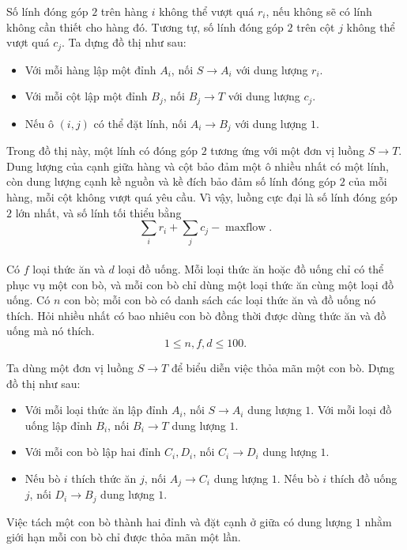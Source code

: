 \documentclass[11pt]{article}
\begin{document}
Số lính đóng góp \(2\) trên hàng \(i\) không thể vượt quá \(r_i\), nếu không
sẽ có lính không cần thiết cho hàng đó. Tương tự, số lính đóng góp \(2\) trên
cột \(j\) không thể vượt quá \(c_j\). Ta dựng đồ thị như sau:
\begin{itemize}
  \item Với mỗi hàng lập một đỉnh \(A_i\), nối \(S\to A_i\) với dung lượng
  \(r_i\).
  \item Với mỗi cột lập một đỉnh \(B_j\), nối \(B_j\to T\) với dung lượng
  \(c_j\).
  \item Nếu ô \((i,j)\) có thể đặt lính, nối \(A_i\to B_j\) với dung lượng
  \(1\).
\end{itemize}

Trong đồ thị này, một lính có đóng góp \(2\) tương ứng với một đơn vị luồng
\(S\to T\). Dung lượng của cạnh giữa hàng và cột bảo đảm một ô nhiều nhất có
một lính, còn dung lượng cạnh kề nguồn và kề đích bảo đảm số lính đóng góp
\(2\) của mỗi hàng, mỗi cột không vượt quá yêu cầu. Vì vậy, luồng cực đại là
số lính đóng góp \(2\) lớn nhất, và số lính tối thiểu bằng
\[
  \sum_i r_i+\sum_j c_j-\operatorname{maxflow}.
\]

\paragraph{}
Có \(f\) loại thức ăn và \(d\) loại đồ uống. Mỗi loại thức ăn hoặc đồ uống chỉ
có thể phục vụ một con bò, và mỗi con bò chỉ dùng một loại thức ăn cùng một
loại đồ uống. Có \(n\) con bò; mỗi con bò có danh sách các loại thức ăn và đồ
uống nó thích. Hỏi nhiều nhất có bao nhiêu con bò đồng thời được dùng thức ăn
và đồ uống mà nó thích.
\[
  1\le n,f,d\le 100.
\]

Ta dùng một đơn vị luồng \(S\to T\) để biểu diễn việc thỏa mãn một con bò.
Dựng đồ thị như sau:
\begin{itemize}
  \item Với mỗi loại thức ăn lập đỉnh \(A_i\), nối \(S\to A_i\) dung lượng
  \(1\). Với mỗi loại đồ uống lập đỉnh \(B_i\), nối \(B_i\to T\) dung lượng
  \(1\).
  \item Với mỗi con bò lập hai đỉnh \(C_i,D_i\), nối \(C_i\to D_i\) dung
  lượng \(1\).
  \item Nếu bò \(i\) thích thức ăn \(j\), nối \(A_j\to C_i\) dung lượng
  \(1\). Nếu bò \(i\) thích đồ uống \(j\), nối \(D_i\to B_j\) dung lượng
  \(1\).
\end{itemize}

Việc tách một con bò thành hai đỉnh và đặt cạnh ở giữa có dung lượng \(1\)
nhằm giới hạn mỗi con bò chỉ được thỏa mãn một lần.
\end{document}
